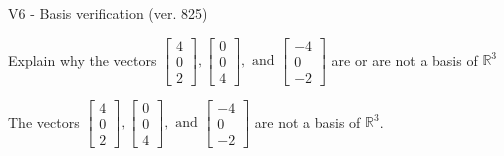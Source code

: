 \begin{exercise}
  \begin{exerciseTitle}V6 - Basis verification (ver. 825)\end{exerciseTitle}
  \begin{exerciseStatement}
    Explain why the vectors \(\left[\begin{array}{r}
4 \\
0 \\
2
\end{array}\right] , \left[\begin{array}{r}
0 \\
0 \\
4
\end{array}\right] , \text{ and } \left[\begin{array}{r}
-4 \\
0 \\
-2
\end{array}\right]\) are or are not a basis of \(\mathbb{R}^3\)	


  \end{exerciseStatement}
  \begin{exerciseAnswer}
   The vectors \(\left[\begin{array}{r}
4 \\
0 \\
2
\end{array}\right] , \left[\begin{array}{r}
0 \\
0 \\
4
\end{array}\right] , \text{ and } \left[\begin{array}{r}
-4 \\
0 \\
-2
\end{array}\right]\) 
  	 are not  a basis of \(\mathbb{R}^3\).
  


  \end{exerciseAnswer}
\end{exercise}